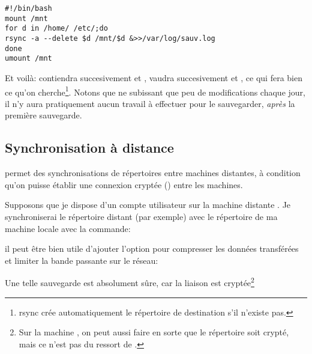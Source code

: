 \begin{center}
  \begin{boxedminipage}{0.85\textwidth}
\begin{verbatim}
#!/bin/bash
mount /mnt
for d in /home/ /etc/;do
rsync -a --delete $d /mnt/$d &>>/var/log/sauv.log
done
umount /mnt
\end{verbatim}
  \end{boxedminipage}
  \end{center}
Et voilà:  contiendra succesivement  et ,
 vaudra succesivement  et
, ce qui fera bien ce qu'on cherche\footnote{
  rsync crée automatiquement le répertoire de destination s'il
  n'existe pas.}. Notons que
 ne subissant que peu de modifications chaque jour, il n'y
aura pratiquement aucun travail à effectuer pour le sauvegarder, \emph{après}
la première sauvegarde.

\subsection{Synchronisation à distance}
 permet des synchronisations de répertoires entre machines
distantes, à condition qu'on puisse établir une connexion cryptée
() entre les machines.

Supposons que je dispose d'un compte utilisateur   sur la
machine  distante . Je synchroniserai
le répertoire distant  (par exemple) avec le
répertoire  de ma machine locale avec la commande:


il peut être bien utile d'ajouter l'option  pour compresser
les données transférées et limiter la bande passante sur le réseau:


Une telle sauvegarde est absolument sûre, car la liaison est
cryptée\footnote{Sur la machine , on peut aussi faire
  en sorte que le répertoire  soit crypté, mais ce n'est
  pas du ressort de .}

